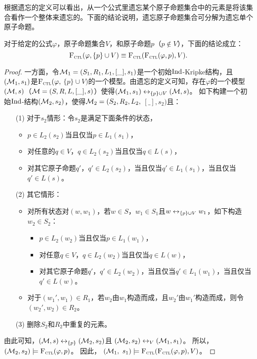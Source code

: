 根据遗忘的定义可以看出，从一个公式里遗忘某个原子命题集合中的元素是将该集合看作一个整体来遗忘的。下面的结论说明，遗忘原子命题集合可分解为遗忘单个原子命题。
\begin{proposition}\label{disTF}
	对于给定的公式$\varphi$，原子命题集合$V$，和原子命题$p$（$p\not \in V$），下面的结论成立：
	\[
	{\textsc{F}_{\textsc{ctl}}}(\varphi,\{p\}\cup V) \equiv {\textsc{F}_{\textsc{ctl}}}({\textsc{F}_{\textsc{ctl}}}(\varphi,p),V).
	\]
\end{proposition}
\begin{proof}
	一方面，令${\cal M}_1=(S_1,R_1,L_1,[\_],s_1)$是一个初始$\textrm{Ind}$-Kripke结构，且$({\cal M}_1,s_1)$是${\textsc{F}_{\textsc{ctl}}}(\varphi,$ $\{p\}\cup V)$的一个模型。由遗忘的定义可知，存在$\varphi$的一个模型$(
	{\cal M},s)$（${\cal M}=(S,R,L,[\_],s)$）使得$({\cal M}_1,s_1)\leftrightarrow_{\{p\}\cup V} ({\cal M},s)$。
	如下构建一个初始$\textrm{Ind}$-结构$({\cal M}_2,s_2)$，使得${\cal M}_2=(S_2,R_2,L_2,$ $[\_],s_2)$且：
	\begin{itemize}
		\item[(1)] 对于$s_2$情形：令$s_2$是满足下面条件的状态，
		\begin{itemize}
			\item $p \in L_2(s_2)$当且仅当$p\in L_1(s_1)$，
			\item 对任意的$q \in V$，$q \in L_2(s_2)$当且仅当$q\in L(s)$，
			\item 对其它原子命题$q'$，$q' \in L_2(s_2)$，当且仅当$q'\in L_1(s_1)$，当且仅当$q'\in L(s)$。
		\end{itemize}
		
		\item[(2)] 其它情形：
		\begin{itemize}
			\item 对所有状态对$(w,w_1)$，若$w\in S$，$w_1\in S_1$且$w\leftrightarrow_{\{p\}\cup V} w_1$，如下构造$w_2\in S_2$：%
			\begin{itemize}
				\item $p \in L_2(w_2)$当且仅当$p\in L_1(w_1)$，
				\item 对任意$q \in V$，$q \in L_2(w_2)$当且仅当$q\in L(w)$，
				\item 对其它原子命题$q'$，$q' \in L_2(w_2)$，当且仅当$q'\in L_1(w_1)$，当且仅当$q'\in L(w)$。
			\end{itemize}
			\item 对于$(w_1',w_1)\in R_1$，若$w_2$由$w_1$构造而成，且$w_2'$由$w_1'$构造而成，则令$(w_2',w_2)\in R_2$。
		\end{itemize}
		\item[(3)] 删除$S_2$和$R_2$中重复的元素。
	\end{itemize}
	由此可知，$({\cal M}, s) \leftrightarrow_{\{p\}} ({\cal M}_2, s_2)$且 $({\cal M}_2, s_2) \leftrightarrow_V ({\cal M}_1, s_1)$。 所以，$({\cal M}_2, s_2) \models {\textsc{F}_{\textsc{ctl}}}(\varphi, p)$。 因此， $({\cal M}_1,$ $s_1) \models {\textsc{F}_{\textsc{ctl}}}({\textsc{F}_{\textsc{ctl}}}(\varphi, p), V)$。
	

\end{proof}
